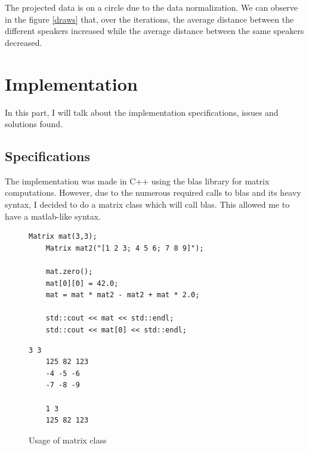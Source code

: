 \documentclass{techrep} %
\begin{document}
The projected data is on a circle due to the data normalization.  We can
observe in the figure \ref{draws} that, over the iterations, the
average distance between the different speakers increased while the
average distance between the same speakers decreased.

\section{Implementation}
In this part, I will talk about the implementation specifications,
issues and solutions found.

\subsection{Specifications}

The implementation was made in C++ using the blas library for matrix
computations.  However, due to the numerous required calls to blas and
its heavy syntax, I decided to do a matrix class which will call blas.
This allowed me to have a matlab-like syntax.



\lstset{language=c++}
\begin{figure}[H]
  \begin{lstlisting}[frame=single]
    Matrix mat(3,3);
    Matrix mat2("[1 2 3; 4 5 6; 7 8 9]");

    mat.zero();
    mat[0][0] = 42.0; 
    mat = mat * mat2 - mat2 + mat * 2.0;
    
    std::cout << mat << std::endl;
    std::cout << mat[0] << std::endl;
  \end{lstlisting}

  \begin{lstlisting}[frame=single]
    3 3
    125 82 123
    -4 -5 -6
    -7 -8 -9

    1 3
    125 82 123
  \end{lstlisting}
  \caption{Usage of matrix class}
  \label{algo_matrix}
\end{figure}
\end{document}
